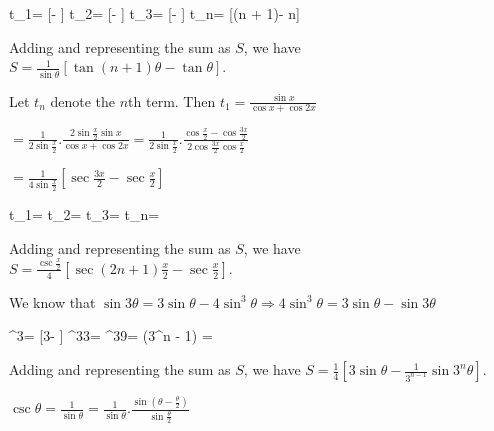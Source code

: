   \startformula\startalign
    \NC t_1\NC = [\theta - \tan\theta]\NR
    \NC t_2\NC = [\theta - \theta]\NR
    \NC t_3\NC = [\theta - \theta]\NR
    \NC \NC \cdots\NR
    \NC t_n\NC = [\tan(n + 1)\theta - \tan n\theta]\NR
  \stopalign\stopformula

  Adding and representing the sum as $S$, we have $S = \frac{1}{\sin\theta}[\tan(n + 1)\theta -
  \tan\theta]$.
\item Let $t_n$ denote the $n$th term. Then $t_1 = \frac{\sin x}{\cos x + \cos2x}$

  $= \frac{1}{2\sin\frac{x}{2}}.\frac{2\sin\frac{x}{2}\sin x}{\cos x + \cos 2x} =
  \frac{1}{2\sin\frac{x}{2}}.\frac{\cos\frac{x}{2} - \cos\frac{3x}{2}}{2\cos\frac{3x}{2}\cos\frac{x}{2}}$

  $= \frac{1}{4\sin\frac{x}{2}}\left[\sec\frac{3x}{2} - \sec\frac{x}{2}\right]$

  \startformula\startalign
    \NC t_1\NC = \NR
    \NC t_2\NC = \NR
    \NC t_3\NC = \NR
    \NC \NC \cdots\NR
    \NC t_n\NC = \NR
  \stopalign\stopformula

  Adding and representing the sum as $S$, we have $S = \frac{\csc\frac{x}{2}}{4}\left[\sec(2n +
    1)\frac{x}{2} - \sec\frac{x}{2}\right]$.
\item We know that $\sin3\theta = 3\sin\theta - 4\sin^3\theta \Rightarrow 4\sin^3\theta = 3\sin\theta -
  \sin3\theta$

  \startformula\startalign
    \NC \sin^3\theta \NC = [3\sin\theta - \theta]\NR
    \NC {}\sin^33\theta \NC = \NR
    \NC {}\sin^39\theta \NC = \NR
    \NC \NC \cdots\NR
    \NC {}\sin\left(3^{n - 1}\theta\right) \NC = \NR
  \stopalign\stopformula

  Adding and representing the sum as $S$, we have $S = \frac{1}{4}\left[3\sin\theta - \frac{1}{3^{n -
        1}}\sin3^n\theta\right]$.
\item $\csc\theta = \frac{1}{\sin\theta} = \frac{1}{\sin\theta}.\frac{\sin\left(\theta -
  \frac{\theta}{2}\right)}{\sin\frac{\theta}{2}}$

